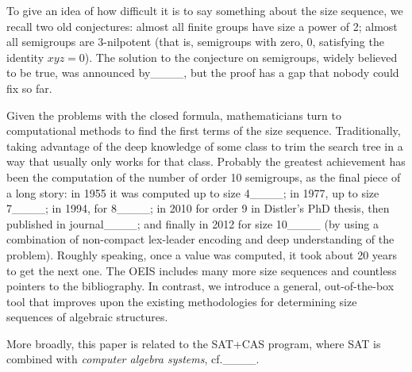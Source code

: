 To give an idea of how difficult it is to say something about the size
sequence, we recall two old conjectures: almost all finite groups have size a
power of 2; almost all semigroups are 3-nilpotent (that is, semigroups with
zero, $0$, satisfying the identity $xyz=0$). The solution to the conjecture on
semigroups, widely believed to be true, was announced by____,
but the proof has a gap that nobody could fix so far.

Given the problems with the closed formula, mathematicians turn to
computational methods to find the first terms of the size sequence.
Traditionally, taking advantage of the deep knowledge of some class to trim the
search tree in a way that usually only works for that class.  Probably the
greatest achievement has been the computation of the number of order 10
semigroups, as the final piece of a long story: in 1955 it was computed up to
size 4____; in 1977, up to size 7____; in
1994, for 8____; in 2010 for order 9 in Distler's PhD thesis, then
published in journal____; and finally in 2012 for size
10____ (by using a combination of non-compact lex-leader
encoding and deep understanding of the problem). Roughly speaking, once a value
was computed, it took about 20 years to get the next one. The OEIS includes
many more size sequences and countless pointers to the bibliography. In
contrast, we introduce a general, out-of-the-box tool that improves upon the
existing methodologies for determining size sequences of algebraic structures.

More broadly, this paper is related to the SAT+CAS program, where SAT is
combined with \emph{computer algebra systems},
cf.____.

